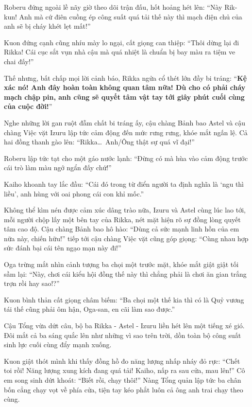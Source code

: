 \documentclass[../main.tex]{subfiles}
\begin{document}
Roberu đứng ngoài lề nãy giờ theo dõi trận đấu, hốt hoảng hét lên: ``Này Rik-kun! Anh mà cứ điên cuồng ép công suất quá tải thế này thì mạch điện chủ của anh sẽ bị cháy khét lẹt mất!''

Kuon đứng cạnh cũng nhíu mày lo ngại, cất giọng can thiệp: ``Thôi dừng lại đi Rikka! Cái cục sắt vụn nhà cậu mà quá nhiệt là chuẩn bị bay màu ra tiệm ve chai đấy!''

Thế nhưng, bất chấp mọi lời cảnh báo, Rikka ngửa cổ thét lớn đầy bi tráng: ``\textbf{Kệ xác nó! Anh đây hoàn toàn không quan tâm nữa! Dù cho có phải cháy mạch chập pin, anh cũng sẽ quyết tâm vật tay tới giây phút cuối cùng của cuộc đời!}''

Nghe những lời gan ruột đẫm chất bi tráng ấy, cậu chàng Bảnh bao Astel và cậu chàng Việc vặt Izuru lập tức cảm động đến mức rưng rưng, khóe mắt ngấn lệ. Cả hai đồng thanh gào lên: ``Rikka\dots\ Anh/Ông thật sự quá vĩ đại!''

Roberu lập tức tạt cho một gáo nước lạnh: ``Đừng có mà hùa vào cảm động trước cái trò làm màu ngớ ngẩn đấy chứ!''

Kaiho khoanh tay lắc đầu: ``Cái đó trong từ điển người ta định nghĩa là `ngu thì liều', anh hùng với oai phong cái con khỉ mốc.''

Không thể kìm nén được cảm xúc dâng trào nữa, Izuru và Astel cùng lúc lao tới, mỗi người chộp lấy một bên tay của Rikka, nét mặt hiện rõ sự đồng lòng quyết tâm cao độ. Cậu chàng Bảnh bao hô hào: ``Dùng cả sức mạnh linh hồn của em nữa này, chiến hữu!'' tiếp tới cậu chàng Việc vặt cũng góp giọng: ``Cùng nhau hợp sức đánh bại cái tên ngạo mạn này đi!''


Oga trừng mắt nhìn cảnh tượng ba chọi một trước mặt, khóe mắt giật giật tối sầm lại: ``Này, chơi cái kiểu hội đồng thế này thì chẳng phải là chơi ăn gian trắng trợn rồi hay sao!?''


Kuon bình thản cất giọng châm biếm: ``Ba chọi một thế kia thì có là Quỷ vương tái thế cũng phải ôm hận, Oga-san, en cãi làm sao được.''

Cậu Tổng vừa dứt câu, bộ ba Rikka - Astel - Izuru liền hét lên một tiếng xé gió. Đôi mắt cả ba sáng quắc lên như những vì sao trên trời, dồn toàn bộ công suất sinh lực cuối cùng đẩy mạnh xuống.


Kuon giật thót mình khi thấy đồng hồ đo năng lượng nhấp nháy đỏ rực: ``Chết toi rồi! Năng lượng xung kích đang quá tải! Kaiho, nấp ra sau cửa, mau lên!'' Cô em song sinh dứt khoát: ``Biết rồi, chạy thôi!'' Nàng Tổng quản lập tức ba chân bốn cẳng chạy vọt về phía cửa, tiện tay kéo phắt luôn cả ông anh trai chạy theo cùng.
\end{document}
